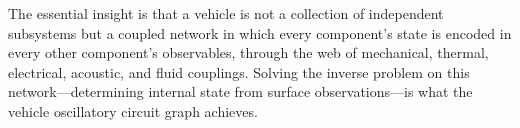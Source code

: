\documentclass[twocolumn,10pt,a4paper]{article}
\theoremstyle{definition}
\theoremstyle{remark}
\begin{document}
The essential insight is that a vehicle is not a collection of independent subsystems but a coupled network in which every component's state is encoded in every other component's observables, through the web of mechanical, thermal, electrical, acoustic, and fluid couplings. Solving the inverse problem on this network---determining internal state from surface observations---is what the vehicle oscillatory circuit graph achieves.




\end{document}
